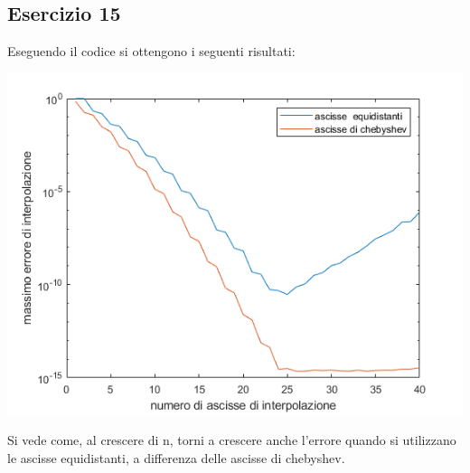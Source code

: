 \subsection{Esercizio 15}
Eseguendo il codice  si ottengono i seguenti risultati:

    
\includegraphics[scale=0.8]{capitolo4/interpol.png}

Si vede come, al crescere di n, torni a crescere anche l'errore quando si utilizzano le ascisse equidistanti, a differenza delle ascisse di chebyshev.